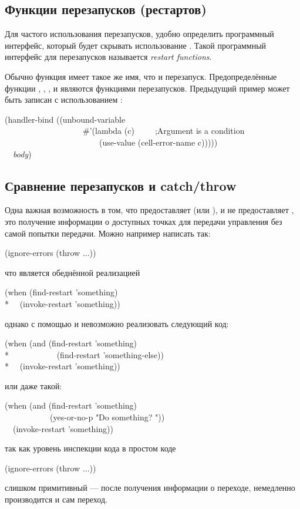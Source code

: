 \subsection{Функции перезапусков (рестартов)}

Для частого использования перезапусков, удобно определить программный интерфейс,
который будет скрывать использование . Такой программный
интерфейс для перезапусков называется \emph{restart functions}.

Обычно функция имеет такое же имя, что и перезапуск. Предопределённые функции
, , ,  и
 являются функциями перезапусков. Предыдущий пример может быть
записан с использованием :
\begin{lisp}
(handler-bind ((unbound-variable \\
~~~~~~~~~~~~~~~~~~~\#'(lambda (c)~~~~~;\textrm{Argument  is a condition} \\
~~~~~~~~~~~~~~~~~~~~~~~(use-value (cell-error-name c))))) \\
~~\emph{body})
\end{lisp}

\subsection{Сравнение перезапусков и catch/throw}

Одна важная возможность в том, что предоставляет  (или
), и не предоставляет , это получение информации о
доступных точках для передачи управления без самой попытки передачи. Можно
например написать так:
\begin{lisp}
(ignore-errors (throw ...))
\end{lisp}
что является обеднённой реализацией 
\begin{lisp}
(when (find-restart 'something) \\*
~~(invoke-restart 'something))
\end{lisp}
однако с помощью  и  невозможно реализовать
следующий код:
\begin{lisp}
(when (and (find-restart 'something) \\*
~~~~~~~~~~~(find-restart 'something-else)) \\*
~~(invoke-restart 'something))
\end{lisp}
или даже такой:
\begin{lisp}
(when (and (find-restart 'something) \\
~~~~~~~~~~~(yes-or-no-p "Do something? ")) \\
~~(invoke-restart 'something))
\end{lisp}
так как уровень инспекции кода в простом коде
\begin{lisp}
(ignore-errors (throw ...))
\end{lisp}
слишком примитивный --- после получения информации о переходе, немедленно
производится и сам переход.

